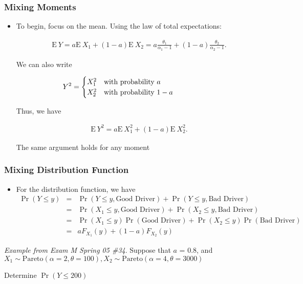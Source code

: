 \documentclass{beamer}
\begin{document}
\begin{frame}[shrink=2]
\frametitle{Mixing Moments}
\begin{itemize}
\item To begin, focus on the mean. Using the law of total
expectations: \vspace{2mm}

\begin{eqnarray*}
\mathrm{E~}Y = a\mathrm{E~}X_1 + (1-a)\mathrm{E~}X_2 = a \frac{\theta_1}{\alpha_1-1} +  (1-a) \frac{\theta_2}{\alpha_2-1} .
\end{eqnarray*} \vspace{2mm}

We can also write \vspace{2mm}

\begin{eqnarray*}
\hspace{-0.8in}Y^2 =
\begin{cases}
X_{1}^2 & \text{with probability~} a\\
X_{2}^2 &  \text{with probability~} 1-a
\end{cases}
\end{eqnarray*} \vspace{2mm}

Thus, we have \vspace{2mm}

\begin{eqnarray*}
\mathrm{E~}Y^2 = a\mathrm{E~}X_{1}^2 + (1-a)\mathrm{E~}X_{2}^2 .
\end{eqnarray*} \vspace{2mm}

The same argument holds for any moment
\end{itemize}
\end{frame}


\begin{frame}[shrink=2]
\frametitle{Mixing Distribution Function}
\begin{itemize}
\item For the distribution function, we have \vspace{2mm}
\begin{eqnarray*}
\Pr(Y \le y) &=& \Pr(Y \le y, \text{Good Driver}) + \Pr(Y \le y, \text{Bad Driver})\\
&=& \Pr(X_1 \le y, \text{Good Driver}) + \Pr(X_2 \le y, \text{Bad Driver})\\
&=& \Pr(X_1 \le y)\Pr(\text{Good Driver}) + \Pr(X_2 \le y)\Pr(\text{Bad Driver})\\
&=& a F_{X_1}(y) + (1-a) F_{X_2}(y)
\end{eqnarray*}
\end{itemize} \vspace{4mm}

\textit{Example from Exam M Spring 05 \#34}. Suppose that $a$ = 0.8,
and $X_1 \sim \text{Pareto}(\alpha = 2, \theta = 100), X_2 \sim
\text{Pareto}(\alpha = 4, \theta = 3000)$ \vspace{2mm}

Determine $\Pr(Y \le 200)$
\end{frame}
\end{document}
